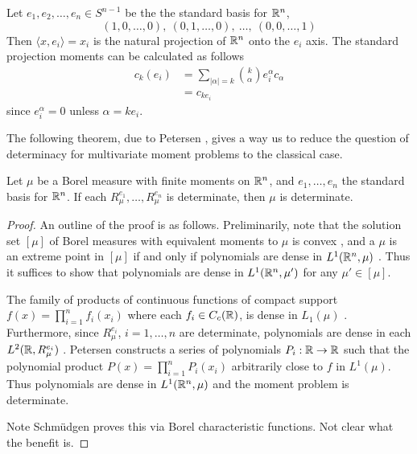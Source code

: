 \begin{myexample}
  Let $e_1, e_2, \ldots, e_n \in S^{n-1}$ be the the standard basis for $\mathbb{R}^n$,
  \[
    (1, 0, \ldots, 0),~ (0, 1, \ldots, 0),~ \ldots,~ (0,0, \ldots, 1)
  \]
  Then $\langle x, e_i \rangle = x_i$ is the natural projection of $\mathbb{R}^n$ onto the $e_i$ axis. The standard projection moments can be calculated as follows
  \begin{align*}
    c_k(e_i) 
    &= \sum_{|\alpha| = k} \binom{k}{\alpha} e_i^\alpha c_\alpha \\
    &= c_{ke_i}
  \end{align*}
  since $e_i^\alpha = 0$ unless $\alpha = ke_i$.
\end{myexample}

The following theorem, due to Petersen \cn, gives a way us to reduce the question of determinacy for multivariate moment problems to the classical case.

\begin{proposition}
  Let $\mu$ be a Borel measure with finite moments on $\mathbb{R}^n$, and $e_1, \ldots, e_n$ the standard basis for $\mathbb{R}^n$. If each $R_\mu^{e_1}, \ldots, R_\mu^{e_n}$ is determinate, then $\mu$ is determinate.
\end{proposition}

\begin{proof}
  An outline of the proof is as follows. Preliminarily, note that the solution set $[\mu]$ of Borel measures with equivalent moments to $\mu$ is convex \cn, and a $\mu$ is an extreme point in $[\mu]$ if and only if polynomials are dense in $L^1(\mathbb{R}^n, \mu)$ \cn. Thus it suffices to show that polynomials are dense in $L^1(\mathbb{R}^n, \mu')$ for any $\mu' \in [\mu]$.
  
  The family of products of continuous functions of compact support $f(x) = \prod_{i=1}^n f_i(x_i)$ where each $f_i \in C_c(\mathbb{R})$, is dense in $L_1(\mu)$ \cn. Furthermore, since $R_\mu^{e_i}$, $i = 1, \ldots, n$ are determinate, polynomials are dense in each $L^2(\mathbb{R}, R_\mu^{e_i})$ \cn. Petersen constructs a series of polynomials $P_i : \mathbb{R} \rightarrow \mathbb{R}$ such that the polynomial product $P(x) = \prod_{i = 1}^n P_i(x_i)$ arbitrarily close to $f$ in $L^1(\mu)$. Thus polynomials are dense in $L^1(\mathbb{R}^n, \mu)$ and the moment problem is determinate. \pn 
  
  Note Schm\"udgen proves this via Borel characteristic functions. Not clear what the benefit is.
\end{proof}

